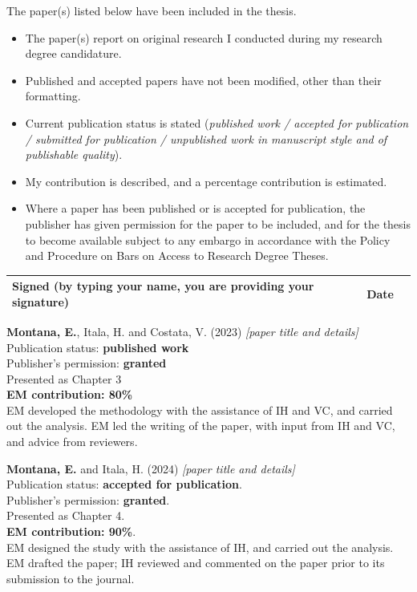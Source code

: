 The paper(s) listed below have been included in the thesis.
\begin{itemize}
  \item The paper(s) report on original research I conducted during my research degree candidature.
  \item Published and accepted papers have not been modified, other than their formatting.
  \item Current publication status is stated (\textit{published work / accepted for publication / submitted for publication / unpublished work in manuscript style and of publishable quality}).
  \item My contribution is described, and a percentage contribution is estimated.
  \item Where a paper has been published or is accepted for publication, the publisher has given permission for the paper to be included, and for the thesis to become available subject to any embargo in accordance with the Policy and Procedure on Bars on Access to Research Degree Theses.
\end{itemize}

\vspace{1em}

\noindent
\begin{tabular}{|p{}|p{}|p{}|p{}|}
\hline
\textbf{Signed} \newline
(by typing your name, you are providing your signature) & & \textbf{Date} & \\
\hline
\end{tabular}

\vspace{1.5em}

\noindent
\textbf{Montana, E.}, Itala, H. and Costata, V. (2023) \textit{[paper title and details]}\\
Publication status: \textbf{published work}\\
Publisher's permission: \textbf{granted}\\
Presented as Chapter 3\\
\textbf{EM contribution: 80\%}\\
EM developed the methodology with the assistance of IH and VC, and carried out the analysis. EM led the writing of the paper, with input from IH and VC, and advice from reviewers.

\vspace{1.25em}

\noindent
\textbf{Montana, E.} and Itala, H. (2024) \textit{[paper title and details]}\\
Publication status: \textbf{accepted for publication}.\\
Publisher's permission: \textbf{granted}.\\
Presented as Chapter 4.\\
\textbf{EM contribution: 90\%}.\\
EM designed the study with the assistance of IH, and carried out the analysis. EM drafted the paper; IH reviewed and commented on the paper prior to its submission to the journal.

